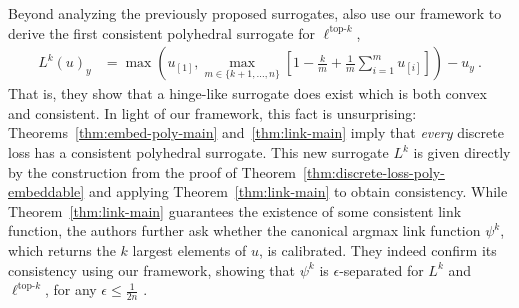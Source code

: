 \documentclass[twoside,11pt]{article}
\newcommand{\reals}{\mathbb{R}}
\newcommand{\prop}[1]{\mathrm{prop}[#1]}
\newcommand{\elltopk}{\ell^{\text{top-$k$}}}
\begin{document}
Beyond analyzing the previously proposed surrogates, \citeauthor{finocchiaro2022consistenttopk} also use our framework to derive the first consistent polyhedral surrogate for $\elltopk$,
\begin{align}\label{eq:topk-embedding}
L^k(u)_y &= \max \left(u_{[1]}, \max_{m \in \{k+1, \ldots, n\}} \left[ 1 - \frac k m + \frac 1 m \sum_{i=1}^m u_{[i]}\right] \right)- u_y~.
\end{align}
That is, they show that a hinge-like surrogate does exist which is both convex and consistent.
In light of our framework, this fact is unsurprising: Theorems~\ref{thm:embed-poly-main} and~\ref{thm:link-main} imply that \emph{every} discrete loss has a consistent polyhedral surrogate.
This new surrogate $L^k$ is given directly by the construction from the proof of Theorem~\ref{thm:discrete-loss-poly-embeddable} and applying Theorem~\ref{thm:link-main} to obtain consistency.
While Theorem~\ref{thm:link-main} guarantees the existence of some consistent link function, the authors further ask whether the canonical argmax link function $\psi^k$, which returns the $k$ largest elements of $u$, is calibrated.
They indeed confirm its consistency using our framework, showing that $\psi^k$ is $\epsilon$-separated for $L^k$ and $\elltopk$, for any $\epsilon \leq \frac 1 {2n}$ \citep[Theorem 4.4]{finocchiaro2022consistenttopk}.


\end{document}
